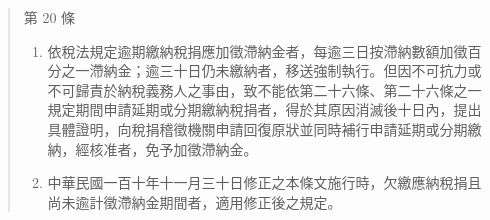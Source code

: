 \documentclass[]{ctexbook}
\providecommand{\tightlist}{%
  \setlength{\itemsep}{0pt}\setlength{\parskip}{0pt}}
\begin{document}
\begin{quote}
第 20 條

\begin{enumerate}
\def\labelenumi{\arabic{enumi}.}
\tightlist
\item
  依稅法規定逾期繳納稅捐應加徵滯納金者，每逾三日按滯納數額加徵百分之一滯納金；逾三十日仍未繳納者，移送強制執行。但因不可抗力或不可歸責於納稅義務人之事由，致不能依第二十六條、第二十六條之一規定期間申請延期或分期繳納稅捐者，得於其原因消滅後十日內，提出具體證明，向稅捐稽徵機關申請回復原狀並同時補行申請延期或分期繳納，經核准者，免予加徵滯納金。
\item
  中華民國一百十年十一月三十日修正之本條文施行時，欠繳應納稅捐且尚未逾計徵滯納金期間者，適用修正後之規定。
\end{enumerate}
\end{quote}
\end{document}
